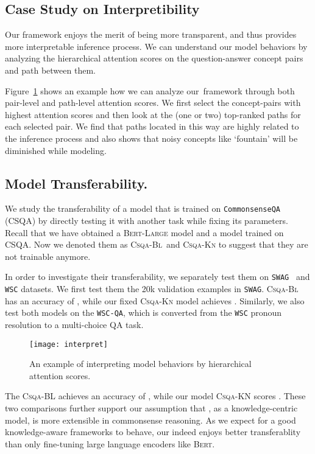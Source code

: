 \documentclass[11pt,a4paper]{article}
\begin{document}
\subsection{Case Study on Interpretibility} 
Our framework enjoys the merit of being more transparent, and thus provides more interpretable inference process.
We can understand our model behaviors by analyzing the hierarchical attention scores on the question-answer concept pairs and path between them. 

Figure~\ref{fig:interpret} shows an example how we can analyze our~\KagNet framework through both pair-level and path-level attention scores.
We first select the concept-pairs with highest attention scores and then look at the (one or two) top-ranked paths for each selected pair.
We find that paths located in this way are highly related to the inference process and also shows that noisy concepts like `fountain' will be diminished while modeling.




\subsection{Model Transferability.} 
We study the transferability of a model that is trained on \texttt{CommonsenseQA} (CSQA) by directly testing it with another task while fixing its parameters.
Recall that we have obtained a \textsc{Bert-Large} model and a \KagNet model trained on CSQA. Now we denoted them as \textsc{Csqa-Bl}~and \textsc{Csqa-Kn} to suggest that they are not trainable anymore. 


In order to investigate their transferability, we separately test them on \texttt{SWAG}~\cite{Zellers2018SWAGAL} and \texttt{WSC} \cite{Levesque2011TheWS} datasets. We first test them the 20k validation examples in \texttt{SWAG}.
\textsc{Csqa-Bl} has an accuracy of , while our fixed \textsc{Csqa-Kn} model achieves . 
Similarly, we also test both models on the \texttt{WSC-QA}, which is converted from the \texttt{WSC} pronoun resolution to a multi-choice QA task.
\begin{figure}[t]
	\centering
	\texttt{[image: interpret]}
	\caption{An example of interpreting model behaviors by hierarchical attention scores. }
	\label{fig:interpret}
\end{figure}

The \textsc{Csqa-BL} achieves an accuracy of , while our model \textsc{Csqa-KN} scores . 
These two comparisons further support our assumption that \KagNet, as a knowledge-centric model, is more extensible in commonsense reasoning.  
As we expect for a good knowledge-aware frameworks to behave, our \KagNet indeed enjoys better transferablity than only fine-tuning large language encoders like \textsc{Bert}. 
\end{document}
